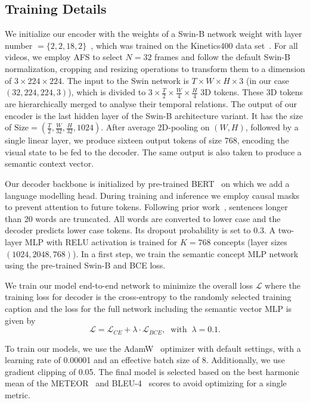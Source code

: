 \documentclass[runningheads,table]{llncs}
\begin{document}
\subsection{Training Details}\label{tab:training}

We initialize our encoder with the weights of a Swin-B network weight with layer number $= \{ 2,2,18,2 \}$~\cite{liu2021swin}, which was trained on the Kinetics400 data set~\cite{kay2017kinetics}.
For all videos, we employ AFS to select $N=32$ frames and follow the default Swin-B normalization, cropping and resizing operations to transform them to a dimension of $3 \times 224 \times 224$. The input to the Swin network is $T \times W \times H \times 3$ (in our case $(32,224,224,3)$), which is divided to $3 \times \frac{T}{2} \times \frac{W}{4} \times \frac{H}{4}$ 3D tokens. These 3D tokens are hierarchically merged to analyse their temporal relations.
The output of our encoder is the last hidden layer of the Swin-B architecture variant. It has the size of $\text{Size}=(\frac{T}{2},\frac{W}{32},\frac{H}{32},1024)$. After average 2D-pooling on $(W,H)$, followed by a single linear layer, we produce sixteen output tokens of size $768$, encoding the visual state to be fed to the decoder. The same output is also taken to produce a semantic context vector.


Our decoder backbone is initialized by pre-trained BERT~\cite{devlin2018bert} on which we add a language modelling head.
During training and inference we employ causal masks to prevent attention to future tokens.
Following prior work~\cite{chen2021motion,chen2018tvt,zhang2020object}, sentences longer than 20 words are truncated. All words are converted to lower case and the decoder predicts lower case tokens. Its dropout probability is set to 0.3.
A two-layer MLP with RELU activation is trained for $K=768$ concepts (layer sizes $(1024, 2048, 768)$).
In a first step, we train the semantic concept MLP network using the pre-trained Swin-B and BCE loss.

We train our model end-to-end network to minimize the overall loss $\mathcal{L}$ where the training loss for decoder is the cross-entropy to the randomly selected training caption and the loss for the full network including the semantic vector MLP is given by 
\begin{equation}
\mathcal{L}=\mathcal{L}_{CE} + \lambda \cdot \mathcal{L}_{BCE}, \;\;\text{with} \;\; \lambda=0.1.
\end{equation}

To train our models, we use the AdamW~\cite{loshchilov2017decoupled} optimizer with default settings, with a learning rate of 0.00001 and an effective batch size of 8. Additionally, we use gradient clipping of 0.05.
The final model is selected based on the best harmonic mean of the METEOR~\cite{banerjee2005meteor} and BLEU-4~\cite{papineni2002bleu} scores to avoid optimizing for a single metric.



 
\end{document}
